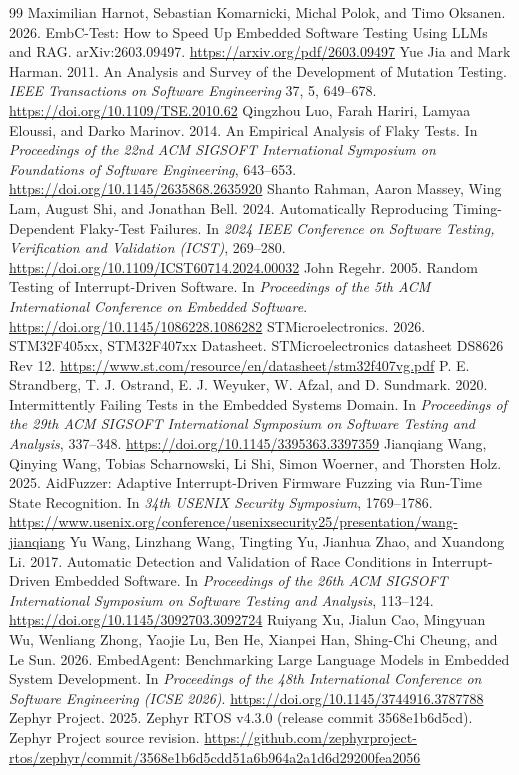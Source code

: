 \documentclass[sigconf,nonacm]{acmart}
\begin{document}
\begin{thebibliography}{99}
 Maximilian Harnot, Sebastian Komarnicki, Michal Polok, and Timo Oksanen. 2026. EmbC-Test: How to Speed Up Embedded Software Testing Using LLMs and RAG. arXiv:2603.09497. \url{https://arxiv.org/pdf/2603.09497}
 Yue Jia and Mark Harman. 2011. An Analysis and Survey of the Development of Mutation Testing. \emph{IEEE Transactions on Software Engineering} 37, 5, 649--678. \url{https://doi.org/10.1109/TSE.2010.62}
 Qingzhou Luo, Farah Hariri, Lamyaa Eloussi, and Darko Marinov. 2014. An Empirical Analysis of Flaky Tests. In \emph{Proceedings of the 22nd ACM SIGSOFT International Symposium on Foundations of Software Engineering}, 643--653. \url{https://doi.org/10.1145/2635868.2635920}
 Shanto Rahman, Aaron Massey, Wing Lam, August Shi, and Jonathan Bell. 2024. Automatically Reproducing Timing-Dependent Flaky-Test Failures. In \emph{2024 IEEE Conference on Software Testing, Verification and Validation (ICST)}, 269--280. \url{https://doi.org/10.1109/ICST60714.2024.00032}
 John Regehr. 2005. Random Testing of Interrupt-Driven Software. In \emph{Proceedings of the 5th ACM International Conference on Embedded Software}. \url{https://doi.org/10.1145/1086228.1086282}
 STMicroelectronics. 2026. STM32F405xx, STM32F407xx Datasheet. STMicroelectronics datasheet DS8626 Rev 12. \url{https://www.st.com/resource/en/datasheet/stm32f407vg.pdf}
 P. E. Strandberg, T. J. Ostrand, E. J. Weyuker, W. Afzal, and D. Sundmark. 2020. Intermittently Failing Tests in the Embedded Systems Domain. In \emph{Proceedings of the 29th ACM SIGSOFT International Symposium on Software Testing and Analysis}, 337--348. \url{https://doi.org/10.1145/3395363.3397359}
 Jianqiang Wang, Qinying Wang, Tobias Scharnowski, Li Shi, Simon Woerner, and Thorsten Holz. 2025. AidFuzzer: Adaptive Interrupt-Driven Firmware Fuzzing via Run-Time State Recognition. In \emph{34th USENIX Security Symposium}, 1769--1786. \url{https://www.usenix.org/conference/usenixsecurity25/presentation/wang-jianqiang}
 Yu Wang, Linzhang Wang, Tingting Yu, Jianhua Zhao, and Xuandong Li. 2017. Automatic Detection and Validation of Race Conditions in Interrupt-Driven Embedded Software. In \emph{Proceedings of the 26th ACM SIGSOFT International Symposium on Software Testing and Analysis}, 113--124. \url{https://doi.org/10.1145/3092703.3092724}
 Ruiyang Xu, Jialun Cao, Mingyuan Wu, Wenliang Zhong, Yaojie Lu, Ben He, Xianpei Han, Shing-Chi Cheung, and Le Sun. 2026. EmbedAgent: Benchmarking Large Language Models in Embedded System Development. In \emph{Proceedings of the 48th International Conference on Software Engineering (ICSE 2026)}. \url{https://doi.org/10.1145/3744916.3787788}
 Zephyr Project. 2025. Zephyr RTOS v4.3.0 (release commit 3568e1b6d5cd). Zephyr Project source revision. \url{https://github.com/zephyrproject-rtos/zephyr/commit/3568e1b6d5cdd51a6b964a2a1d6d29200fea2056}
\end{thebibliography}
\end{document}
